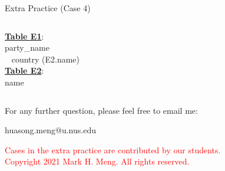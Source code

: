 \begin{frame}[fragile]{Extra Practice (Case 4)}
\begin{columns}
	
		\underline{\textbf{Table E1}}: \\ party\_name\\ ~ country (E2.name) \\\vspace{5pt}
		\underline{\textbf{Table E2}}: \\ name
	\end{columns}
\end{frame}

	
\begin{frame}{}
	\centering  
	For any further question, please feel free to email me:\vspace{10pt}
	
	huasong.meng@u.nus.edu \vspace{20pt}
	
	\begin{tcolorbox}
		\begin{center}
			\textcolor{red}{Cases in the extra practice are contributed by our students.\\\vspace{5pt}Copyright 2021 Mark H. Meng. All rights reserved.}
		\end{center}
	\end{tcolorbox}
\end{frame}